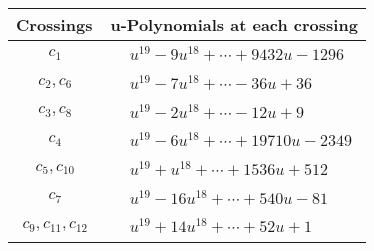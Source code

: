 \documentclass[1p]{elsarticle_modified}
\theoremstyle{definition}
\begin{document}
\begin{tabular}{m{50pt}|m{274pt}}
Crossings & \hspace{64pt}u-Polynomials at each crossing \\
\hline $$\begin{aligned}c_{1}\end{aligned}$$&$\begin{aligned}
&u^{19}-9 u^{18}+\cdots+9432 u-1296
\end{aligned}$\\
\hline $$\begin{aligned}c_{2},c_{6}\end{aligned}$$&$\begin{aligned}
&u^{19}-7 u^{18}+\cdots-36 u+36
\end{aligned}$\\
\hline $$\begin{aligned}c_{3},c_{8}\end{aligned}$$&$\begin{aligned}
&u^{19}-2 u^{18}+\cdots-12 u+9
\end{aligned}$\\
\hline $$\begin{aligned}c_{4}\end{aligned}$$&$\begin{aligned}
&u^{19}-6 u^{18}+\cdots+19710 u-2349
\end{aligned}$\\
\hline $$\begin{aligned}c_{5},c_{10}\end{aligned}$$&$\begin{aligned}
&u^{19}+u^{18}+\cdots+1536 u+512
\end{aligned}$\\
\hline $$\begin{aligned}c_{7}\end{aligned}$$&$\begin{aligned}
&u^{19}-16 u^{18}+\cdots+540 u-81
\end{aligned}$\\
\hline $$\begin{aligned}c_{9},c_{11},c_{12}\end{aligned}$$&$\begin{aligned}
&u^{19}+14 u^{18}+\cdots+52 u+1
\end{aligned}$\\
\hline
\end{tabular}\\~\\
\newpage\renewcommand{\arraystretch}{1}
\end{document}
